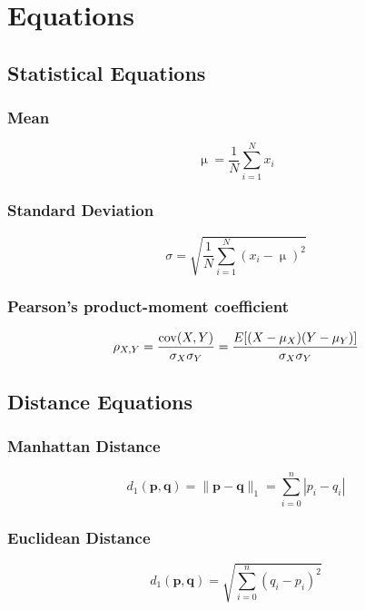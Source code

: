 \chapter{Equations}

\section{Statistical Equations}

\subsection{Mean}
\begin{equation*}
\upmu = \frac{1}{N}\sum_{i=1}^{N}x_i
\end{equation*}

\subsection{Standard Deviation}
\begin{equation*}
\sigma = \sqrt{\frac{1}{N}\sum_{i=1}^{N}(x_i - \upmu)^2}
\end{equation*}

\subsection{Pearson's product-moment coefficient}
\begin{equation*}
\rho_{X,Y}={\mathrm{cov}(X,Y) \over \sigma_X \sigma_Y} ={E[(X-\mu_X)(Y-\mu_Y)] \over \sigma_X\sigma_Y}
\end{equation*}

\section{Distance Equations}

\subsection{Manhattan Distance}
\begin{equation*}
d_1(\mathbf{p},\mathbf{q}) = \|\mathbf{p}-\mathbf{q}\|_1 = \sum^{n}_{i=0}{|p_i-q_i|}
\end{equation*}

\subsection{Euclidean Distance}
\begin{equation*}
d_1(\mathbf{p}, \mathbf{q}) = \sqrt{\sum^{n}_{i=0}({q_i-p_i})^2}
\end{equation*}

